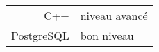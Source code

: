 
\begin{tabularx}{\textwidth}{@{}d @{ : } X@{}}
  C++ & niveau avancé\\
  PostgreSQL & bon niveau\\
\end{tabularx}

